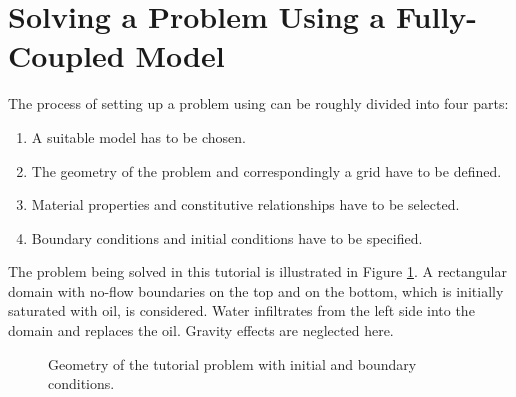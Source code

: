 \section[Fully-Implicit Model]{Solving a Problem Using a Fully-Coupled Model}\label{tutorial-coupled}

The process of setting up a problem using \Dumux can be roughly divided into four parts:
\begin{enumerate}
 \item A suitable model has to be chosen.
 \item The geometry of the problem and correspondingly a grid have to be defined.
 \item Material properties and constitutive relationships have to be selected.
 \item Boundary conditions and initial conditions have to be specified.
\end{enumerate}

The problem being solved in this tutorial is illustrated in Figure \ref{tutorial-coupled:problemfigure}. 
A rectangular domain with no-flow boundaries on the top and on the bottom, which is initially saturated with oil, is considered. 
Water infiltrates from the left side into the domain and replaces the oil. Gravity effects are neglected here.

\begin{figure}[ht]
\centering
{}
\caption{Geometry of the tutorial problem with initial and boundary conditions.}
\label{tutorial-coupled:problemfigure}
\end{figure}

